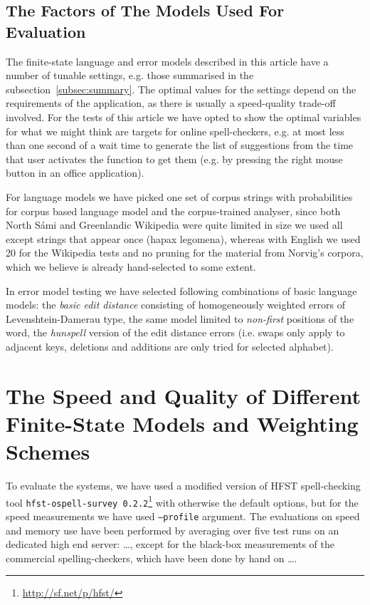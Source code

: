 \documentclass[a4paper,12pt]{article}
\begin{document}
\subsection{The Factors of The Models Used For Evaluation}
\label{subsec:factors}

The finite-state language and error models described in this article have a
number of tunable settings, e.g. those summarised in the 
subsection~\ref{subsec:summary}. The optimal values for the settings depend on
the requirements of the application, as there is usually a speed-quality
trade-off involved. For the tests of this article we have opted to show the
optimal variables for what we might think are targets for online
spell-checkers, e.g. at most less than one second of a wait time to generate
the list of suggestions from the time that user activates the function to
get them (e.g. by pressing the right mouse button in an office application).

For language models we have picked one set of corpus strings with probabilities
for corpus based language model and the corpus-trained analyser, since both
North Sámi and Greenlandic Wikipedia were quite limited in size we used all
except strings that appear once (hapax legomena), whereas with English we used
20 for the Wikipedia tests and no pruning for the material from Norvig's
corpora, which we believe is already hand-selected to some extent.

In error model testing we have selected following combinations of basic
language models: the \emph{basic edit distance} consisting of homogeneously
weighted errors of Levenshtein-Damerau type, the same model limited to
\emph{non-first} positions of the word, the \emph{hunspell} version of the edit
distance errors (i.e. swaps only apply to adjacent keys, deletions and
additions are only tried for selected alphabet).


\section{The Speed and Quality of Different Finite-State Models and Weighting
Schemes}
\label{sec:evaluation}

To evaluate the systems, we have used a modified version of HFST spell-checking
tool \texttt{hfst-ospell-survey 0.2.2}\footnote{\url{http://sf.net/p/hfst/}}
with otherwise the default options, but for the speed measurements we have used
\texttt{--profile} argument.  The evaluations on speed and memory use have been
performed by averaging over five test runs on an dedicated high end server:
\ldots, except for the black-box measurements of the commercial
spelling-checkers, which have been done by hand on \ldots.
\end{document}

